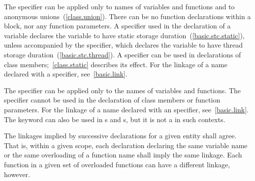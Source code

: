 \pnum
{}%
The  specifier can be applied only to names of variables and
functions and to anonymous unions~(\ref{class.union}). There can be no
 function declarations within a block, nor any
 function parameters. A  specifier used in
the declaration of a variable declares the variable to have static storage
duration~(\ref{basic.stc.static}), unless accompanied by the
 specifier, which declares the variable to have thread
storage duration~(\ref{basic.stc.thread}). A  specifier can be
used in declarations of class members;~\ref{class.static} describes its
effect.
%
For the linkage of a name declared with a  specifier,
see~\ref{basic.link}.

\pnum
{}%
The  specifier can be applied only to the names of variables
and functions. The  specifier cannot be used in the
declaration of class members or function parameters.
%
%
For the linkage of a name declared with an  specifier,
see~\ref{basic.link}.
\enternote
The  keyword can also be used in
s and
s, but it is not a
 in such contexts.
\exitnote

\pnum
The linkages implied by successive declarations for a given entity shall
agree. That is, within a given scope, each declaration declaring the
same variable name or the same overloading of a function name shall imply
the same linkage. Each function in a given set of overloaded functions
can have a different linkage, however.
\enterexample
{}%


